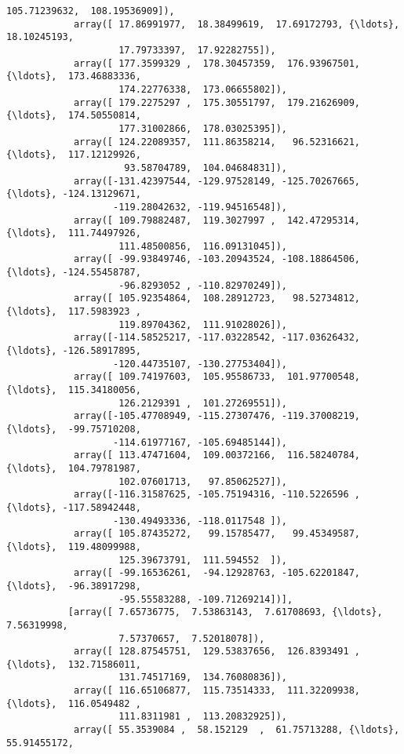 \documentclass[11pt]{article}
\begin{document}
\begin{Verbatim}[commandchars=\\\{\}]
                    105.71239632,  108.19536909]),
            array([ 17.86991977,  18.38499619,  17.69172793, {\ldots},  18.10245193,
                    17.79733397,  17.92282755]),
            array([ 177.3599329 ,  178.30457359,  176.93967501, {\ldots},  173.46883336,
                    174.22776338,  173.06655802]),
            array([ 179.2275297 ,  175.30551797,  179.21626909, {\ldots},  174.50550814,
                    177.31002866,  178.03025395]),
            array([ 124.22089357,  111.86358214,   96.52316621, {\ldots},  117.12129926,
                     93.58704789,  104.04684831]),
            array([-131.42397544, -129.97528149, -125.70267665, {\ldots}, -124.13129671,
                   -119.28042632, -119.94516548]),
            array([ 109.79882487,  119.3027997 ,  142.47295314, {\ldots},  111.74497926,
                    111.48500856,  116.09131045]),
            array([ -99.93849746, -103.20943524, -108.18864506, {\ldots}, -124.55458787,
                    -96.8293052 , -110.82970249]),
            array([ 105.92354864,  108.28912723,   98.52734812, {\ldots},  117.5983923 ,
                    119.89704362,  111.91028026]),
            array([-114.58525217, -117.03228542, -117.03626432, {\ldots}, -126.58917895,
                   -120.44735107, -130.27753404]),
            array([ 109.74197603,  105.95586733,  101.97700548, {\ldots},  115.34180056,
                    126.2129391 ,  101.27269551]),
            array([-105.47708949, -115.27307476, -119.37008219, {\ldots},  -99.75710208,
                   -114.61977167, -105.69485144]),
            array([ 113.47471604,  109.00372166,  116.58240784, {\ldots},  104.79781987,
                    102.07601713,   97.85062527]),
            array([-116.31587625, -105.75194316, -110.5226596 , {\ldots}, -117.58942448,
                   -130.49493336, -118.0117548 ]),
            array([ 105.87435272,   99.15785477,   99.45349587, {\ldots},  119.48099988,
                    125.39673791,  111.594552  ]),
            array([ -99.16536261,  -94.12928763, -105.62201847, {\ldots},  -96.38917298,
                    -95.55583288, -109.71269214])],
           [array([ 7.65736775,  7.53863143,  7.61708693, {\ldots},  7.56319998,
                    7.57370657,  7.52018078]),
            array([ 128.87545751,  129.53837656,  126.8393491 , {\ldots},  132.71586011,
                    131.74517169,  134.76080836]),
            array([ 116.65106877,  115.73514333,  111.32209938, {\ldots},  116.0549482 ,
                    111.8311981 ,  113.20832925]),
            array([ 55.3539084 ,  58.152129  ,  61.75713288, {\ldots},  55.91455172,

\end{Verbatim}
\end{document}
